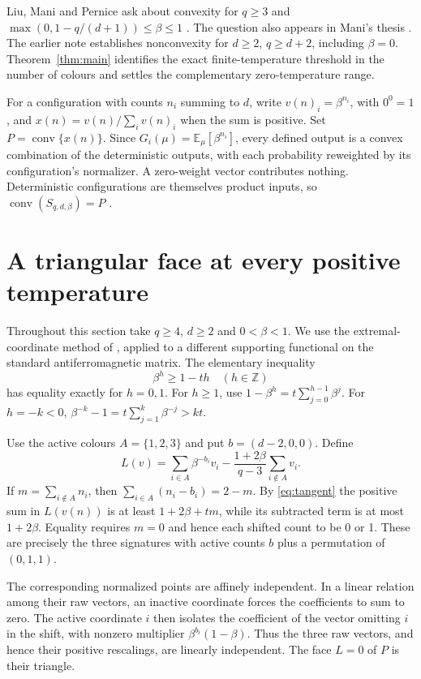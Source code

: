 \documentclass[11pt,reqno]{amsart}
\newcommand{\Sbp}{S_{q,d,\beta}}
\newcommand{\E}{\mathbb E}
\DeclareMathOperator{\conv}{conv}
\begin{document}
Liu, Mani and Pernice ask about convexity for $q\ge3$ and $\max(0,1-q/(d+1))\le\beta\le1$ \cite[Question~4]{LMP}. The question also appears in Mani's thesis \cite[Question~3.9.18]{Mani}. The earlier note \cite{Short} establishes nonconvexity for $d\ge2$, $q\ge d+2$, including $\beta=0$. Theorem~\ref{thm:main} identifies the exact finite-temperature threshold in the number of colours and settles the complementary zero-temperature range.

For a configuration with counts $n_i$ summing to $d$, write $v(n)_i=\beta^{n_i}$, with $0^0=1$, and $x(n)=v(n)/\sum_i v(n)_i$ when the sum is positive. Set $P=\conv\{x(n)\}$. Since $G_i(\mu)=\E_\mu[\beta^{n_i}]$, every defined output is a convex combination of the deterministic outputs, with each probability reweighted by its configuration's normalizer. A zero-weight vector contributes nothing. Deterministic configurations are themselves product inputs, so $\conv(\Sbp)=P$ \cite[Lemma~A.1]{LMP}.

\section{A triangular face at every positive temperature}

Throughout this section take $q\ge4$, $d\ge2$ and $0<\beta<1$. We use the extremal-coordinate method of \cite[Lemma~2.2 and Remark~3]{LMP}, applied to a different supporting functional on the standard antiferromagnetic matrix. The elementary inequality
\begin{equation}\label{eq:tangent}
 \beta^h\ge 1-th\quad(h\in\mathbb Z)
\end{equation}
has equality exactly for $h=0,1$. For $h\ge1$, use $1-\beta^h=t\sum_{j=0}^{h-1}\beta^j$. For $h=-k<0$, $\beta^{-k}-1=t\sum_{j=1}^{k}\beta^{-j}>kt$.

Use the active colours $A=\{1,2,3\}$ and put $b=(d-2,0,0)$. Define
\[
 L(v)=\sum_{i\in A}\beta^{-b_i}v_i-
          \frac{1+2\beta}{q-3}\sum_{i\notin A}v_i .
\]
If $m=\sum_{i\notin A}n_i$, then $\sum_{i\in A}(n_i-b_i)=2-m$. By \eqref{eq:tangent} the positive sum in $L(v(n))$ is at least $1+2\beta+tm$, while its subtracted term is at most $1+2\beta$. Equality requires $m=0$ and hence each shifted count to be 0 or 1. These are precisely the three signatures with active counts $b$ plus a permutation of $(0,1,1)$.

The corresponding normalized points are affinely independent. In a linear relation among their raw vectors, an inactive coordinate forces the coefficients to sum to zero. The active coordinate $i$ then isolates the coefficient of the vector omitting $i$ in the shift, with nonzero multiplier $\beta^{b_i}(1-\beta)$. Thus the three raw vectors, and hence their positive rescalings, are linearly independent. The face $L=0$ of $P$ is their triangle.
\end{document}
